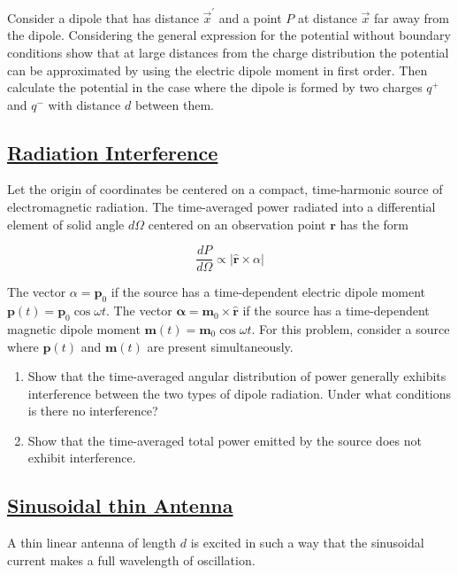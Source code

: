 Consider a dipole that has distance $\vec{x}^{\prime}$ and a point $P$ at distance $\vec{x}$ far away from the dipole. Considering the general expression for the potential without boundary conditions show that at large distances from the charge distribution the potential can be approximated by using the electric dipole moment in first order. Then calculate the potential in the case where the dipole is formed by two charges $q^{+}$ and $q^{-}$ with distance $d$ between them.

\subsection{\hyperref[Radiation Interference]{Radiation Interference}}

Let the origin of coordinates be centered on a compact, time-harmonic source of electromagnetic radiation. The time-averaged power radiated into a differential element of solid angle $d \Omega$ centered on an observation point $\mathbf{r}$ has the form

\begin{equation}
	\frac{d P}{d \Omega} \propto|\hat{\mathbf{r}} \times \alpha|
\end{equation}

The vector $\alpha=\mathbf{p}_{0}$ if the source has a time-dependent electric dipole moment $\mathbf{p}(t)=\mathbf{p}_{0} \cos \omega t .$ The vector $\boldsymbol{\alpha}=\mathbf{m}_{0} \times \hat{\mathbf{r}}$ if the source has a time-dependent magnetic dipole moment $\mathbf{m}(t)=\mathbf{m}_{0} \cos \omega t .$ For this problem, consider a source where $\mathbf{p}(t)$ and $\mathbf{m}(t)$ are present simultaneously.

\begin{enumerate}
	\item Show that the time-averaged angular distribution of power generally exhibits interference between the two types of dipole radiation. Under what conditions is there no interference?
	\item Show that the time-averaged total power emitted by the source does not exhibit interference.
\end{enumerate}

\subsection{\hyperref[Sinusoidal thin Antenna]{Sinusoidal thin Antenna}}

A thin linear antenna of length $d$ is excited in such a way that the sinusoidal current makes a full wavelength of oscillation.

